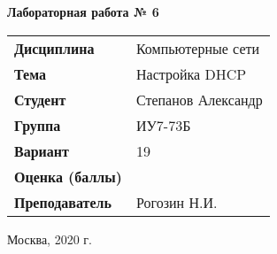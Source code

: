 \begin{center}
    \textbf{Лабораторная работа № 6} \\
    \vspace{0.5cm}
\end{center}

\vspace{4cm}

\begin{flushleft}
    \begin{tabular}{ll}
        \textbf{Дисциплина} & Компьютерные сети \\
        \textbf{Тема} & Настройка DHCP \\
        \textbf{Студент} & Степанов Александр \\
        \textbf{Группа} & ИУ7-73Б \\
        \textbf{Вариант} & 19 \\
        \textbf{Оценка (баллы)} & \\
        \textbf{Преподаватель} & Рогозин Н.И. \\
    \end{tabular}
\end{flushleft}

\vspace{4cm}

\begin{center}
    Москва, 2020 г.
\end{center}
